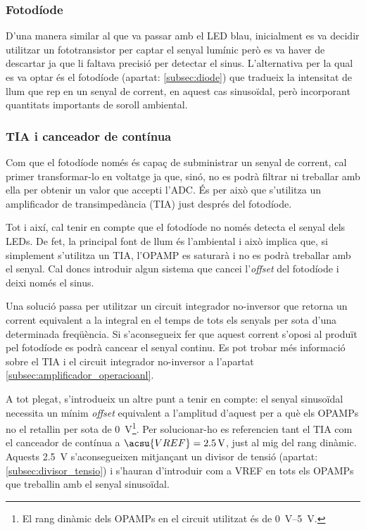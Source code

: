 \subsubsection{Fotodíode}

D'una manera similar al que va passar amb el \ac{LED} blau, inicialment es va decidir utilitzar un fototransistor per captar el senyal lumínic però es va haver de descartar ja que li faltava precisió per detectar el sinus. L'alternativa per la qual es va optar és el fotodíode (apartat: \ref{subsec:diode}) que tradueix la intensitat de llum que rep en un senyal de corrent, en aquest cas sinusoïdal, però incorporant quantitats importants de soroll ambiental.

\subsubsection{\acl{TIA} i cance\lgem ador de contínua}\label{itm:vref}

Com que el fotodíode només és capaç de subministrar un senyal de corrent, cal primer transformar-lo en voltatge ja que, sinó, no es podrà filtrar ni treballar amb ella per obtenir un valor que accepti l'\ac{ADC}. És per això que s'utilitza un amplificador de transimpedància (\acs{TIA}) just després del fotodíode.

Tot i així, cal tenir en compte que el fotodíode no només detecta el senyal dels \acp{LED}. De fet, la principal font de llum és l'ambiental i això implica que, si simplement s'utilitza un \ac{TIA}, l'\ac{OPAMP} es saturarà i no es podrà treballar amb el senyal. Cal doncs introduir algun sistema que cance\lgem i l'\textit{offset} del fotodíode i deixi només el sinus.

Una solució passa per utilitzar un circuit integrador no-inversor que retorna un corrent equivalent a la integral en el temps de tots els senyals per sota d'una determinada freqüència. Si s'aconsegueix fer que aquest  corrent s'oposi al produït pel fotodíode es podrà cance\lgem ar el senyal continu. Es pot trobar més informació sobre el \ac{TIA} i el circuit integrador no-inversor a l'apartat \ref{subsec:amplificador_operacioanl}.

A tot plegat, s'introdueix un altre punt a tenir en compte: el senyal sinusoïdal necessita un mínim \textit{offset} equivalent a l'amplitud d'aquest per a què els \acp{OPAMP} no el retallin per sota de \SI{0}{\volt}\footnote{El rang dinàmic dels \acp{OPAMP} en el circuit utilitzat és de \SIrange[range-phrase = \ a\ ]{0}{5}{\volt}.}. Per solucionar-ho es referencien tant el \ac{TIA} com el cance\lgem ador de contínua a $ \acsu{VREF} = \SI{2.5}{\volt} $, just al mig del rang dinàmic. Aquests \SI{2.5}{\volt} s'aconsegueixen mitjançant un divisor de tensió (apartat: \ref{subsec:divisor_tensio}) i s'hauran d'introduir com a \ac{VREF} en tots els \acp{OPAMP} que treballin amb el senyal sinusoïdal.

